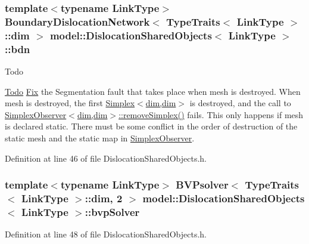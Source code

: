 \subsubsection[{bdn}]{\setlength{\rightskip}{0pt plus 5cm}template$<$typename Link\+Type$>$ {\bf Boundary\+Dislocation\+Network}$<$ {\bf Type\+Traits}$<$ {\bf Link\+Type} $>$\+::{\bf dim} $>$ {\bf model\+::\+Dislocation\+Shared\+Objects}$<$ {\bf Link\+Type} $>$\+::bdn\hspace{0.3cm}{\ttfamily [static]}}\label{structmodel_1_1_dislocation_shared_objects_a1ebde927216271979599e324ce29e65a}
\begin{DoxyRefDesc}{Todo}
\item[\hyperlink{todo__todo000002}{Todo}]\hyperlink{structmodel_1_1_fix}{Fix} the Segmentation fault that takes place when mesh is destroyed. When mesh is destroyed, the first \hyperlink{classmodel_1_1_simplex_3_01dim_00_01dim_01_4}{Simplex$<$dim,dim$>$} is destroyed, and the call to \hyperlink{structmodel_1_1_simplex_observer_acd3b33890ad0aa0cee424cb8cc6d56fe}{Simplex\+Observer$<$dim,dim$>$\+::remove\+Simplex()} fails. This only happens if mesh is declared static. There must be some conflict in the order of destruction of the static mesh and the static map in \hyperlink{structmodel_1_1_simplex_observer}{Simplex\+Observer}. \end{DoxyRefDesc}


Definition at line 46 of file Dislocation\+Shared\+Objects.\+h.

\hypertarget{structmodel_1_1_dislocation_shared_objects_ae36c8459eef6497fc82c9650d4b61a3a}{}
\subsubsection[{bvp\+Solver}]{\setlength{\rightskip}{0pt plus 5cm}template$<$typename Link\+Type$>$ {\bf B\+V\+Psolver}$<$ {\bf Type\+Traits}$<$ {\bf Link\+Type} $>$\+::{\bf dim}, 2 $>$ {\bf model\+::\+Dislocation\+Shared\+Objects}$<$ {\bf Link\+Type} $>$\+::bvp\+Solver\hspace{0.3cm}{\ttfamily [static]}}\label{structmodel_1_1_dislocation_shared_objects_ae36c8459eef6497fc82c9650d4b61a3a}


Definition at line 48 of file Dislocation\+Shared\+Objects.\+h.

\hypertarget{structmodel_1_1_dislocation_shared_objects_ab38af6b9f62b37c9741434c42582cf7d}{}
